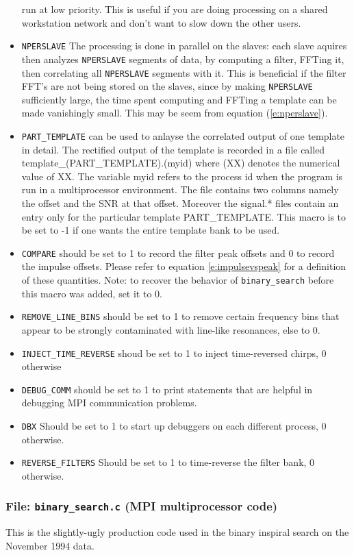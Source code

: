 \begin{itemize}
run at low priority.  This is useful if you are doing processing on a
shared workstation network and don't want to slow down the other users.
\item
{\tt NPERSLAVE}
The processing is done in parallel on the slaves: each slave aquires
then analyzes {\tt NPERSLAVE} segments of data, by computing a filter,
FFTing it, then correlating all {\tt NPERSLAVE} segments with it.
This is beneficial if the filter FFT's are not being stored on the
slaves, since by making {\tt NPERSLAVE} sufficiently large, the time
spent computing and FFTing a template can be made vanishingly small.
This may be seem from equation (\ref{e:nperslave}).
\item
{\tt PART\_TEMPLATE} can be used to anlayse the correlated output of
one template in detail. The rectified output of the template is
recorded in a file called template\_(PART\_TEMPLATE).(myid) where (XX)
denotes the numerical value of XX. The variable myid refers to the 
process id when the program is run in a multiprocessor environment. 
The file contains two columns
namely the offset and the SNR at that offset. Moreover the signal.*
files contain an entry only for the particular template PART\_TEMPLATE.
This macro is to be set to -1 if one wants the
entire template bank to be used.  
\item
{\tt COMPARE} should be set to 1 to record the filter peak offsets and
0 to record the impulse offsets.  Please
refer to equation \ref{e:impulsevspeak} for a definition of these
quantities. Note: to recover the behavior of
{\tt binary\_search} before this macro was added, set it to 0.
\item
{\tt REMOVE\_LINE\_BINS} should be set to 1 to remove certain frequency bins
 that appear to be strongly contaminated with line-like resonances, else to 0.
\item
{\tt INJECT\_TIME\_REVERSE} shoud be set to 1 to inject time-reversed chirps, 0 otherwise
\item
{\tt DEBUG\_COMM} should be set to 1 to print statements that are helpful in debugging MPI communication problems.
\item
{\tt DBX}
Should be set to 1 to start up debuggers on each different process, 0 otherwise.
\item
{\tt REVERSE\_FILTERS}
Should be set to 1 to time-reverse the filter bank, 0 otherwise.

\end{itemize}
\clearpage

\subsubsection{File: \texttt{binary\_search.c} (MPI multiprocessor code)}
This is the slightly-ugly production code used in the binary inspiral search
on the November 1994 data.
\clearpage

